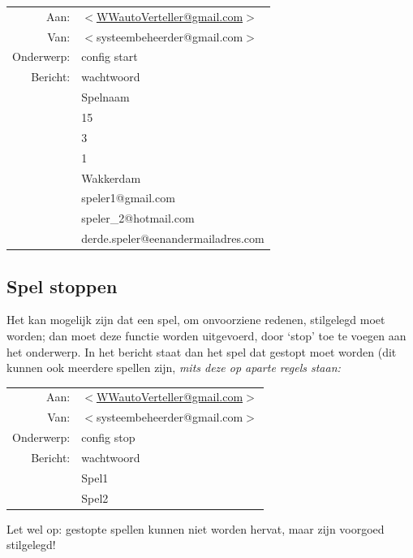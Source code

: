 \documentclass[12pt]{article}
\begin{document}
    \begin{center}
      \begin{tabularx}{0.75\textwidth}[c]{|r X|}
	\hline
	Aan: & \href{mailto:<WWautoVerteller@gmail.com>}{$<$WWautoVerteller@gmail.com$>$} \\
	Van: & $<$systeembeheerder@gmail.com$>$ \\
	Onderwerp: & config start \\[\baselineskip]	
	Bericht: & wachtwoord \\
	 & Spelnaam \\
	 & 15 \\
	 & 3 \\
	 & 1 \\
	 & Wakkerdam \\
	 & speler1@gmail.com \\
	 & speler\_2@hotmail.com \\
	 & derde.speler@eenandermailadres.com \\
	\hline
      \end{tabularx}
    \end{center}
  
  \subsection{Spel stoppen}
  
    Het kan mogelijk zijn dat een spel, om onvoorziene redenen, stilgelegd moet worden; dan moet deze functie worden uitgevoerd, door `stop' toe te voegen aan het onderwerp. In het bericht staat dan het spel dat gestopt moet worden (dit kunnen ook meerdere spellen zijn, \emph{mits deze op aparte regels staan:}
    
    \begin{center}
      \begin{tabularx}{0.75\textwidth}[c]{|r X|}
	\hline
	Aan: & \href{mailto:<WWautoVerteller@gmail.com>}{$<$WWautoVerteller@gmail.com$>$} \\
	Van: & $<$systeembeheerder@gmail.com$>$ \\
	Onderwerp: & config stop \\[\baselineskip]	
	Bericht: & wachtwoord \\
	 & Spel1 \\
	 & Spel2 \\
	\hline
      \end{tabularx}
    \end{center}
    
    Let wel op: gestopte spellen kunnen niet worden hervat, maar zijn voorgoed stilgelegd!
  
\end{document}
